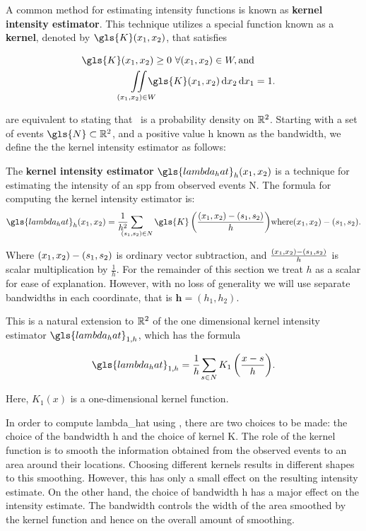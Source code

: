 A common method for estimating \gls{intensity} functions is known as
\textbf{\gls{kernel intensity estimator}}.
This technique utilizes a special function known as a \textbf{\gls{kernel}},
denoted by $\gls{K}\xvec$,
that satisfies

\begin{align}
    \gls{K}\xvec \ge 0~ \forall \xvec \in W, \text{and} \label{eq:k_pos} \\%
    \iintW{\gls{K}\xvec} & = 1 \label{eq:k_1} \text{.}%
\end{align}

 are equivalent to stating that \Kdots~is a probability density on $\mathbb{R}^2$.
Starting with a set of \glspl{event} $\gls{N} \subset \RS$,
and a positive value \gls{h} known as the bandwidth,
we define the the \gls{kernel intensity estimator} as follows:

\begin{defn}
    \label{defn:lambda_hat}
    The \textbf{\gls{kernel intensity estimator}} $\gls{lambda_hat}_h \xvec$
    is a technique for estimating the \gls{intensity} of an \gls{spp}
    from observed \glspl{event} \gls{N}.
    The formula for computing the \gls{kernel intensity estimator} is:
    \begin{equation}
        \label{eq:lambda_hat}
        \gls{lambda_hat}_h \xvec%
            = \sumS{\gls{K}\left( \frac{\xvec-(s_1, s_2)}{h} \right)}%
              \text{where} \xvec-(s_1, s_2) \text{.}%
    \end{equation}
\end{defn}

Where $(x_1, x_2)-(s_1, s_2)$ is ordinary vector subtraction,
and $\frac{(x_1, x_2)-(s_1, s_2)}{h}$ is scalar multiplication by $\frac{1}{h}$.
For the remainder of this section we treat $h$ as a scalar for ease of explanation.
However, with no loss of generality we will use separate bandwidths in each coordinate,
that is $\mathbf{h}=(h_1, h_2)$.

This is a natural extension to $\mathbb{R}^2$ of the one dimensional \gls{kernel intensity estimator} $\gls{lambda_hat}_{1,h}$,
which has the formula

\begin{equation}
    \label{eq:lambda_hat_1}
    \gls{lambda_hat}_{1,h} = \sumSone{K_1\left( \frac{x - s}{h} \right)} \text{.}%
\end{equation}

Here, $K_1(x)$ is a one-dimensional kernel function.

In order to compute \gls{lambda_hat} using ,
there are two choices to be made: the choice of the bandwidth \gls{h}
and the choice of \gls{kernel} \gls{K}.
The role of the \gls{kernel} function \Kdots is to smooth the information obtained
from the observed \glspl{event} to an area around their locations.
Choosing different \glspl{kernel} results in different shapes to this smoothing.
However, this has only a small effect on the resulting \gls{intensity} estimate.
On the other hand,
the choice of bandwidth \gls{h} has a major effect on the \gls{intensity} estimate.
The bandwidth controls the width of the area smoothed by the \gls{kernel} function and hence on the overall amount of smoothing.

